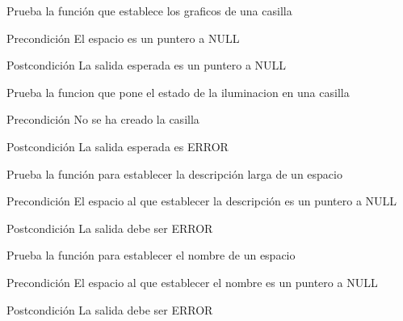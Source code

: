 \begin{DoxyRefList}
\item[\label{test__test000252}%
\hypertarget{test__test000252}{}%
Global \hyperlink{space__test_8c_ad0ad053c397f4972787cb3525bee417d}{test2\-\_\-space\-\_\-set\-\_\-graphics} ()]Prueba la función que establece los graficos de una casilla \begin{DoxyPrecond}{Precondición}
El espacio es un puntero a N\-U\-L\-L 
\end{DoxyPrecond}
\begin{DoxyPostcond}{Postcondición}
La salida esperada es un puntero a N\-U\-L\-L  
\end{DoxyPostcond}

\item[\label{test__test000318}%
\hypertarget{test__test000318}{}%
Global \hyperlink{space__test_8c_a5ed49360db0e40aed36514ee59b2a42e}{test2\-\_\-space\-\_\-set\-\_\-iluminated} ()]Prueba la funcion que pone el estado de la iluminacion en una casilla \begin{DoxyPrecond}{Precondición}
No se ha creado la casilla 
\end{DoxyPrecond}
\begin{DoxyPostcond}{Postcondición}
La salida esperada es E\-R\-R\-O\-R  
\end{DoxyPostcond}

\item[\label{test__test000249}%
\hypertarget{test__test000249}{}%
Global \hyperlink{space__test_8c_a669293c8c232547b7bfc913e38856abd}{test2\-\_\-space\-\_\-set\-\_\-long\-\_\-description} ()]Prueba la función para establecer la descripción larga de un espacio \begin{DoxyPrecond}{Precondición}
El espacio al que establecer la descripción es un puntero a N\-U\-L\-L 
\end{DoxyPrecond}
\begin{DoxyPostcond}{Postcondición}
La salida debe ser E\-R\-R\-O\-R  
\end{DoxyPostcond}

\item[\label{test__test000243}%
\hypertarget{test__test000243}{}%
Global \hyperlink{space__test_8c_a5a868ba017602ba6b58447cb394e81a6}{test2\-\_\-space\-\_\-set\-\_\-name} ()]Prueba la función para establecer el nombre de un espacio \begin{DoxyPrecond}{Precondición}
El espacio al que establecer el nombre es un puntero a N\-U\-L\-L 
\end{DoxyPrecond}
\begin{DoxyPostcond}{Postcondición}
La salida debe ser E\-R\-R\-O\-R  
\end{DoxyPostcond}


\end{DoxyRefList}
